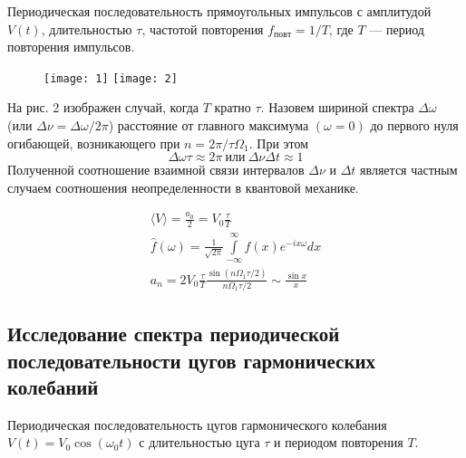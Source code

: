 Периодическая последовательность прямоугольных импульсов с амплитудой $ V(t) $, длительностью $\tau$, частотой повторения $ f_{повт} = 1/T $, где $ T $ — период повторения импульсов.

\begin{figure}[H]
    \begin{floatrow}
        {\texttt{[image: 1]}}
        {\texttt{[image: 2]}}        
    \end{floatrow}
\end{figure}

На рис. 2 изображен случай, когда $T$
кратно $\tau$. Назовем шириной спектра
$\Delta \omega$ (или $\Delta \nu =
\Delta \omega/2\pi$) расстояние от
главного максимума $(\omega = 0)$ до
первого нуля огибающей, возникающего при
$n = 2\pi/\tau \Omega_1$. При этом 
\begin{equation}
    \Delta \omega \tau \approx 2\pi \
    \text{или} \ \Delta \nu \Delta t
    \approx 1
\end{equation}
Полученной соотношение взаимной связи
интервалов $\Delta \nu$ и $\Delta t$
является частным случаем соотношения
неопределенности в квантовой механике.

\begin{equation}
\begin{gathered}
\langle V\rangle = \frac{a_{0}}{2} = V_{0} \frac{\tau}{T} \\
\hat{f}(\omega) = \frac{1}{\sqrt{2
\pi}} \int\limits_{-\infty}^{\infty} f(x) e^{-i
x \omega} d x \\
a_{n}=2 V_{0} \frac{\tau}{T} \frac{\sin \left(n \Omega_{1} \tau / 2\right)}{n \Omega_{1} \tau / 2} \sim \frac{\sin x}{x}
\end{gathered}
\end{equation}


\subsection*{Исследование спектра периодической последовательности цугов гармонических колебаний }


Периодическая последовательность цугов гармонического колебания $ V(t) = V_{0}\cos(\omega_{0}t) $ с длительностью цуга $\tau$ и периодом повторения $T$.





